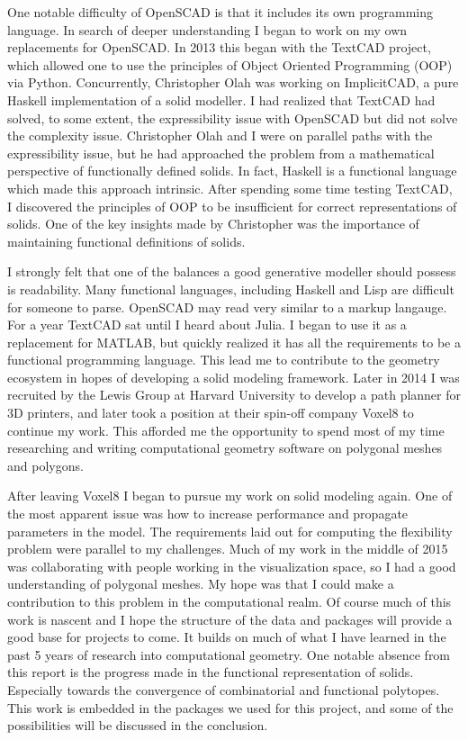 One notable difficulty of OpenSCAD is that it includes its own
programming language.
In search of deeper understanding I began to work on my own replacements
for OpenSCAD. In 2013 this began with the TextCAD project, which allowed
one to use the principles of Object Oriented Programming (OOP) via Python.
Concurrently, Christopher Olah was working on ImplicitCAD, a pure
Haskell implementation of a solid modeller. I had realized that TextCAD
had solved, to some extent, the expressibility issue with OpenSCAD but
did not solve the complexity issue. Christopher Olah and I were on
parallel paths with the expressibility issue, but he had approached
the problem from a mathematical perspective of functionally defined
solids. In fact, Haskell is a functional language which made this approach
intrinsic. After spending some time testing TextCAD, I discovered
the principles of OOP to be insufficient for correct representations
of solids. One of the key insights made by Christopher was the importance
of maintaining functional definitions of solids.

I strongly felt that one of the balances a good generative modeller should
possess is readability. Many functional languages, including Haskell and
Lisp are difficult for someone to parse. OpenSCAD may read very similar
to a markup langauge.
For a year TextCAD
sat until I heard about Julia. I began to use it as a replacement for
MATLAB, but quickly realized it has all the requirements to be a
functional programming language. This lead me to contribute to the
geometry ecosystem in hopes of developing a solid modeling framework.
Later in 2014 I was recruited by the Lewis Group
at Harvard University to develop a path planner for 3D printers, and
later took a position at their spin-off company Voxel8 to continue my work.
This afforded me the opportunity to spend most of my time researching and
writing computational geometry software on polygonal meshes and
polygons.

After leaving Voxel8 I began to pursue my work on solid modeling again.
One of the most apparent issue was how to increase performance and
propagate parameters in the model.
The requirements laid out for computing the flexibility
problem were parallel to my challenges. Much of my work in the middle of 2015
was collaborating with people working in the visualization space, so I
had a good understanding of polygonal meshes. My hope was that I could
make a contribution to this problem in the computational realm. Of course
much of this work is nascent and I hope the structure of the
data and packages will provide a good base for projects to come.
It builds on much of what I have learned in the past 5 years of research
into computational geometry.
One notable absence from this report is the progress made in the
functional representation of solids. Especially towards the convergence of
combinatorial and functional polytopes. This work is embedded in the
packages we used for this project, and some of the possibilities will
be discussed in the conclusion.





